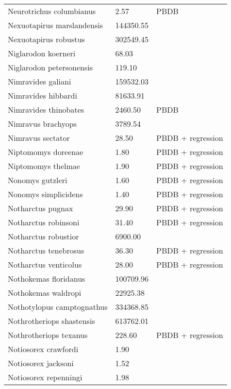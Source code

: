 \begin{longtable}{p{} p{} p{}}
    Neurotrichus columbianus & 2.57 & PBDB \\ 
    Nexuotapirus marslandensis & 144350.55 & \cite{Tomiya2013} \\ 
    Nexuotapirus robustus & 302549.45 & \cite{Tomiya2013} \\ 
    Niglarodon koerneri & 68.03 & \cite{Tomiya2013} \\ 
    Niglarodon petersonensis & 119.10 & \cite{Tomiya2013} \\ 
    Nimravides galiani & 159532.03 & \cite{Tomiya2013} \\ 
    Nimravides hibbardi & 81633.91 & \cite{Tomiya2013} \\ 
    Nimravides thinobates & 2460.50 & PBDB \\ 
    Nimravus brachyops & 3789.54 & \cite{Tomiya2013} \\ 
    Nimravus sectator & 28.50 & PBDB + regression \\ 
    Niptomomys doreenae & 1.80 & PBDB + regression \\ 
    Niptomomys thelmae & 1.90 & PBDB + regression \\ 
    Nonomys gutzleri & 1.60 & PBDB + regression \\ 
    Nonomys simplicidens & 1.40 & PBDB + regression \\ 
    Notharctus pugnax & 29.90 & PBDB + regression \\ 
    Notharctus robinsoni & 31.40 & PBDB + regression \\ 
    Notharctus robustior & 6900.00 & \cite{Soligo2006} \\ 
    Notharctus tenebrosus & 36.30 & PBDB + regression \\ 
    Notharctus venticolus & 28.00 & PBDB + regression \\ 
    Nothokemas floridanus & 100709.96 & \cite{Tomiya2013} \\ 
    Nothokemas waldropi & 22925.38 & \cite{Tomiya2013} \\ 
    Nothotylopus camptognathus & 334368.85 & \cite{Tomiya2013} \\ 
    Nothrotheriops shastensis & 613762.01 & \cite{Brook2004a} \\ 
    Nothrotheriops texanus & 228.60 & PBDB + regression \\ 
    Notiosorex crawfordi & 1.90 & \cite{Smith2004} \\ 
    Notiosorex jacksoni & 1.52 & \cite{Madden1985} \\ 
    Notiosorex repenningi & 1.98 & \cite{Lillegraven1977} \\ 

\end{longtable}
